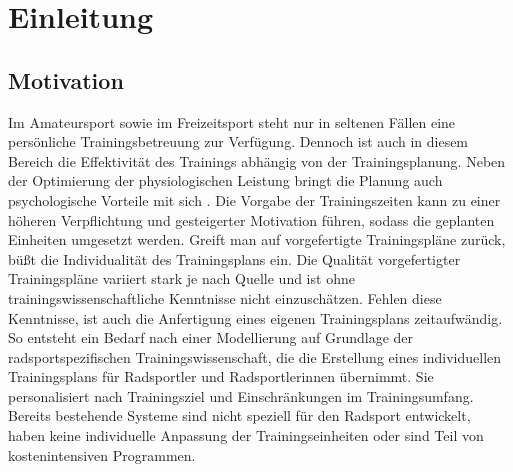 \chapter{Einleitung}
\label{sec:einleitung}
\section{Motivation}
Im Amateursport sowie im Freizeitsport steht nur in seltenen Fällen eine persönliche Trainingsbetreuung zur Verfügung. Dennoch ist auch in diesem Bereich die Effektivität des Trainings abhängig von der Trainingsplanung. Neben der Optimierung der physiologischen Leistung bringt die Planung auch psychologische Vorteile mit sich . Die Vorgabe der Trainingszeiten kann zu einer höheren Verpflichtung und gesteigerter Motivation führen, sodass die geplanten Einheiten umgesetzt werden.
Greift man auf vorgefertigte Trainingspläne zurück, büßt die Individualität des Trainingsplans ein. Die Qualität vorgefertigter Trainingspläne variiert stark je nach Quelle und ist ohne trainingswissenschaftliche Kenntnisse nicht einzuschätzen. Fehlen diese Kenntnisse, ist auch die Anfertigung eines eigenen Trainingsplans zeitaufwändig. 
So entsteht ein Bedarf nach einer Modellierung auf Grundlage der radsportspezifischen Trainingswissenschaft, die die Erstellung eines individuellen Trainingsplans für Radsportler und Radsportlerinnen übernimmt. Sie personalisiert nach Trainingsziel und Einschränkungen im Trainingsumfang. 
Bereits bestehende Systeme sind nicht speziell für den Radsport entwickelt, haben keine individuelle Anpassung der Trainingseinheiten oder sind Teil von kostenintensiven Programmen.


